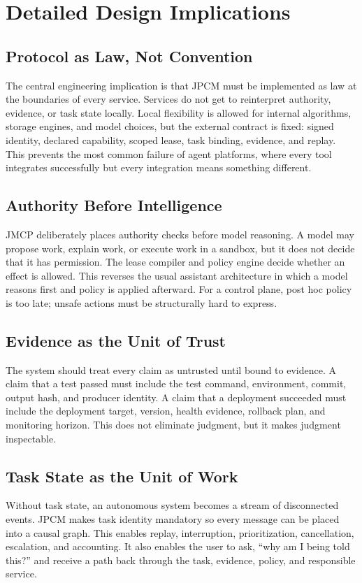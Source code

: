 \documentclass[10pt,journal,onecolumn]{IEEEtran}
\begin{document}
\section{Detailed Design Implications}
\subsection{Protocol as Law, Not Convention}
The central engineering implication is that JPCM must be implemented as law at the boundaries of every service. Services do not get to reinterpret authority, evidence, or task state locally. Local flexibility is allowed for internal algorithms, storage engines, and model choices, but the external contract is fixed: signed identity, declared capability, scoped lease, task binding, evidence, and replay. This prevents the most common failure of agent platforms, where every tool integrates successfully but every integration means something different.

\subsection{Authority Before Intelligence}
JMCP deliberately places authority checks before model reasoning. A model may propose work, explain work, or execute work in a sandbox, but it does not decide that it has permission. The lease compiler and policy engine decide whether an effect is allowed. This reverses the usual assistant architecture in which a model reasons first and policy is applied afterward. For a control plane, post hoc policy is too late; unsafe actions must be structurally hard to express.

\subsection{Evidence as the Unit of Trust}
The system should treat every claim as untrusted until bound to evidence. A claim that a test passed must include the test command, environment, commit, output hash, and producer identity. A claim that a deployment succeeded must include the deployment target, version, health evidence, rollback plan, and monitoring horizon. This does not eliminate judgment, but it makes judgment inspectable.

\subsection{Task State as the Unit of Work}
Without task state, an autonomous system becomes a stream of disconnected events. JPCM makes task identity mandatory so every message can be placed into a causal graph. This enables replay, interruption, prioritization, cancellation, escalation, and accounting. It also enables the user to ask, ``why am I being told this?'' and receive a path back through the task, evidence, policy, and responsible service.
\end{document}
